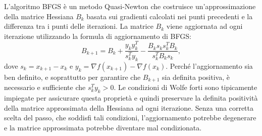 L'algoritmo BFGS è un metodo Quasi-Newton che costruisce un'approssimazione della matrice Hessiana \( B_k \) basata sui gradienti calcolati nei punti precedenti e la differenza tra i punti delle iterazioni. La matrice \( B_k \) viene aggiornata ad ogni iterazione utilizzando la formula di aggiornamento di BFGS:\@
\begin{equation}\label{eq:bfgs_update}
B_{k+1} = B_k + \frac{y_k y_k^T}{s_k^T y_k} - \frac{B_k s_k s_k^T B_k}{s_k^T B_k s_k},
\end{equation}
dove \( s_k = x_{k+1} - x_k \) e \( y_k = \nabla f(x_{k+1}) - \nabla f(x_k) \). Perché l'aggiornamento sia ben definito, e soprattutto per garantire che \( B_{k+1} \) sia definita positiva, è necessario e sufficiente che \( s_k^T y_k > 0 \). Le condizioni di Wolfe forti sono tipicamente impiegate per assicurare questa proprietà e quindi preservare la definita positività della matrice approssimata della Hessiana ad ogni iterazione. Senza una corretta scelta del passo, che soddisfi tali condizioni, l'aggiornamento potrebbe degenerare e la matrice approssimata potrebbe diventare mal condizionata.

